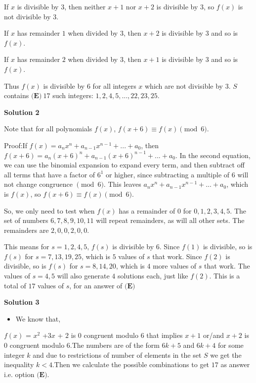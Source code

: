 \begin{enumerate}
 If $x$ is divisible by $3$, then neither $x+1$ nor $x+2$ is divisible by $3$, so $f(x)$ is not divisible by $3$.  

 If $x$ has remainder $1$ when divided by $3$, then $x+2$ is divisible by $3$ and so is $f(x)$.

 If $x$ has remainder $2$ when divided by $3$, then $x+1$ is divisible by $3$ and so is $f(x)$.

 Thus $f(x)$ is divisible by $6$ for all integers $x$ which are not divisible by $3$.  $S$ contains $\boxed{\textbf{(E)}\ 17}$ such integers: $1, 2, 4, 5, ..., 22, 23, 25$.

 



\textbf{Solution 2}

Note that for all polynomials $f(x)$, $f(x + 6) \equiv f(x) \pmod 6$.  

 Proof:If $f(x) = a_nx^n + a_{n-1}x^{n-1} + ... + a_0$, then $f(x+6) = a_n(x+6)^n + a_{n-1}(x+6)^{n-1} +...+ a_0$.  In the second equation, we can use the binomial expansion to expand every term, and then subtract off all terms that have a factor of $6^1$ or higher, since subtracting a multiple of $6$ will not change congruence $\pmod 6$.  This leaves $a_nx^n + a_{n-1}x^{n-1} + ... + a_0$, which is $f(x)$, so $f(x+6) \equiv f(x) \pmod 6$.

 So, we only need to test when $f(x)$ has a remainder of $0$ for $0, 1, 2, 3, 4, 5$.  The set of numbers $6, 7, 8, 9, 10, 11$ will repeat remainders, as will all other sets.  The remainders are $2, 0, 0, 2, 0, 0$.

 This means for $s=1, 2, 4, 5$, $f(s)$ is divisible by $6$.  Since $f(1)$ is divisible, so is $f(s)$ for $s=7, 13, 19, 25$, which is $5$ values of $s$ that work.  Since $f(2)$ is divisible, so is $f(s)$ for $s=8, 14, 20$, which is $4$ more values of $s$ that work.  The values of $s=4, 5$ will also generate $4$ solutions each, just like $f(2)$.  This is a total of $17$ values of $s$, for an answer of $\boxed{\textbf{(E)}}$




\textbf{Solution 3}


            \begin{itemize}
        \item We know that,
            \end{itemize}
            $f(x)$ = $x^2$ +$3x$ + $2$ is $0$ congruent modulo 6 that implies $x+1$ or/and $x+2$ is $0$ congruent modulo $6$.The numbers are of the form $6k+5$ and $6k+4$ for some integer $k$ and due to restrictions of number of elements in the set $S$ we get the inequality $k<4$.Then we calculate the possible combinations to get  $17$ as answer i.e. option $\boxed{\textbf{(E)}}$.


\end{enumerate}
